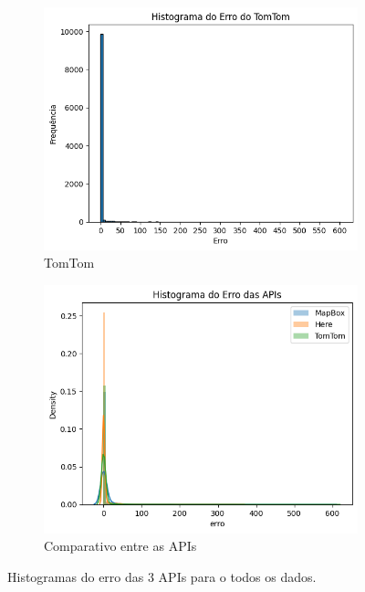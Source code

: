 \begin{figure}[ht]
  \begin{subfigure}[b]{0.45\textwidth}
    \includegraphics[width=\textwidth]{Figuras/hist3.png}
    \caption{TomTom}
    \label{fig:hist3}
  \end{subfigure}
  \hfill
  \begin{subfigure}[b]{0.45\textwidth}
    \includegraphics[width=\textwidth]{Figuras/hist4.png}
    \caption{Comparativo entre as APIs}
    \label{fig:hist4}
  \end{subfigure}
  
  \caption{Histogramas do erro das 3 APIs para o todos os dados.}
  \label{fig:hist-global}
\end{figure}

